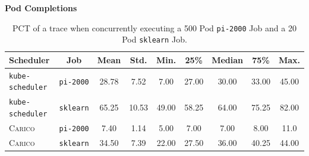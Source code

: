 
\textbf{Pod Completions}\\
\begin{table}[ht!]
\centering
    \begin{tabular}{|l|c|c|c|c|c|c|c|c|}
    \hline
        \bfseries Scheduler & \bfseries Job & \bfseries Mean & \bfseries Std. &
        \bfseries Min. & \bfseries 25\% & \bfseries Median & \bfseries 75\% & \bfseries Max. \\
    \hline
        \texttt{kube-scheduler} & \texttt{pi-2000} & 28.78 & 7.52 & 7.00 & 27.00 & 30.00 & 33.00 & 45.00 \\
        \texttt{kube-scheduler} & \texttt{sklearn} & 65.25 & 10.53 & 49.00 & 58.25 & 64.00 & 75.25 & 82.00 \\
        \textsc{Carico} & \texttt{pi-2000} & 7.40 & 1.14 & 5.00 & 7.00 & 7.00 & 8.00 & 11.0 \\
        \textsc{Carico} & \texttt{sklearn} & 34.50 & 7.39 & 22.00 & 27.50 & 36.00 & 40.25 & 44.00 \\
    \hline
    \end{tabular}
    \caption{PCT of a trace when concurrently executing a 500 Pod \texttt{pi-2000}
    Job and a 20 Pod \texttt{sklearn} Job.}
    \label{tab:mixed-pod-completions}
\end{table}

